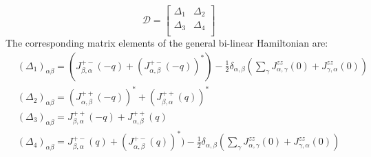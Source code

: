  \[
 \mathcal{D} =
\left[ {\begin{array}{cc}
	\Delta _1 & \Delta _2 \\
	\Delta _3 & \Delta _4 \\
	\end{array} } \right]
\]
The corresponding matrix elements of the general bi-linear Hamiltonian are:
\begin{equation}
	\begin{split}
		&(\Delta _1)_{\alpha \beta} = (J^{+-}_{\beta,\alpha}(-q) + (J^{+-}_{\alpha,\beta}(-q))^*) - \frac{1}{2}\delta_{\alpha,\beta}(\sum_{\gamma}^{}J^{zz}_{\alpha,\gamma}(0) + J^{zz}_{\gamma,\alpha}(0)) \\
		&(\Delta _2)_{\alpha \beta} = (J_{\alpha,\beta}^{++}(-q))^* + (J_{\beta,\alpha}^{++}(q))^*\\
		&(\Delta _3)_{\alpha \beta} = J^{++}_{\beta,\alpha}(-q) + J^{++}_{\alpha, \beta}(q)\\
		&(\Delta _4)_{\alpha \beta} = J^{+-}_{\beta,\alpha}(q) + (J^{+-}_{\alpha,\beta}(q))^*) - \frac{1}{2}\delta_{\alpha,\beta}(\sum_{\gamma}^{}J^{zz}_{\alpha,\gamma}(0) + J^{zz}_{\gamma,\alpha}(0))
	\end{split}	
\end{equation}

